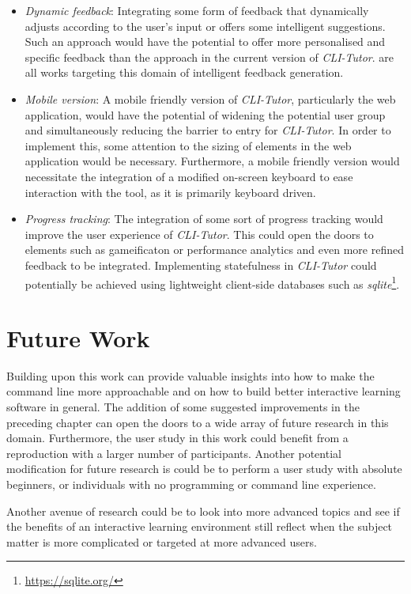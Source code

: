 \begin{itemize}

	\item  \textit{Dynamic feedback}: Integrating some form of feedback that
	      dynamically adjusts according to the user's input or offers some
	      intelligent suggestions. Such an approach would have the potential to
	      offer more personalised and specific feedback than the approach in the
	      current version of \textit{CLI-Tutor}. \cite{keuning2014strategy,
		      gerdes2017ask, rivers2017data} are all works targeting this domain of
	      intelligent feedback generation.

	\item \textit{Mobile version}: A mobile friendly version of
	      \textit{CLI-Tutor}, particularly the web application, would have the
	      potential of widening the potential user group and simultaneously
	      reducing the barrier to entry for \textit{CLI-Tutor}. In order to
	      implement this, some attention to the sizing of elements in the web
	      application would be necessary. Furthermore, a mobile friendly
	      version would necessitate the integration of a modified on-screen
	      keyboard to ease interaction with the tool, as it is primarily
	      keyboard driven.

	\item \textit{Progress tracking}: The integration of some sort of
	      progress tracking would improve the user experience of
	      \textit{CLI-Tutor}. This could open the doors to elements such as
	      gameificaton or performance analytics and even more refined feedback
	      to be integrated. Implementing statefulness in \textit{CLI-Tutor}
	      could potentially be achieved using lightweight client-side databases
	      such as \textit{sqlite}\footnote{\url{https://sqlite.org/}}.

\end{itemize}


\section{Future Work}
Building upon this work can provide valuable insights into how to make the
command line more approachable and on how to build better interactive learning
software in general. The addition of some suggested improvements in the
preceding chapter can open the doors to a wide array of future research in
this domain. Furthermore, the user study in this work could benefit from a
reproduction with a larger number of participants. Another potential
modification for future research is could be to perform a user study with
absolute beginners, or individuals with no programming or command line
experience.

Another avenue of research could be to look into more advanced topics and see if
the benefits of an interactive learning environment still reflect when the
subject matter is more complicated or targeted at more advanced users.
